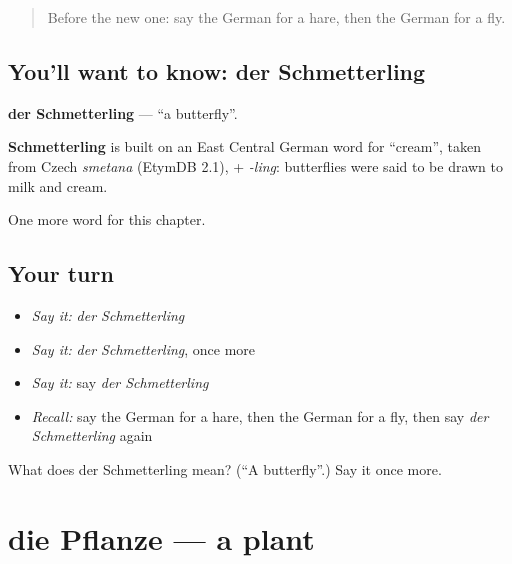 \label{lesson:GE-C198-schmetterling}



\begin{quote}
Before the new one: say the German for a hare, then the German for a fly.
\end{quote}

\subsection*{You'll want to know: der Schmetterling}
\textbf{der Schmetterling} — \textquotedblleft{}a butterfly\textquotedblright{}.

\begin{cousinweb}
\textbf{Schmetterling} is built on an East Central German word for \textquotedblleft{}cream\textquotedblright{}, taken from Czech \emph{smetana} (EtymDB 2.1), + \emph{-ling}: butterflies were said to be drawn to milk and cream.
\end{cousinweb}

\begin{grammarlens}[title={What you've built}]
One more word for this chapter.
\end{grammarlens}

\subsection*{Your turn}
\begin{itemize}
\raggedright
  \item \emph{Say it:} \emph{der Schmetterling}
  \item \emph{Say it:} \emph{der Schmetterling}, once more
  \item \emph{Say it:} say \emph{der Schmetterling}
  \item \emph{Recall:} say the German for a hare, then the German for a fly, then say \emph{der Schmetterling} again
\end{itemize}

\begin{tcolorbox}[breakable,colback=teal!4,colframe=teal!35!black,title={Before you move on}]
What does der Schmetterling mean? (\textquotedblleft{}A butterfly\textquotedblright{}.) Say it once more.
\end{tcolorbox}
\section[die Pflanze]{die Pflanze — a plant}

